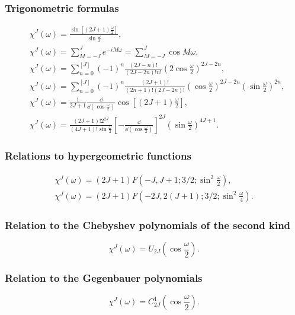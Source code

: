 \subsubsection{ Trigonometric formulas}
\begin{align}
& \chi^{J}(\omega)=\frac{\sin \left[(2 J+1) \frac{\omega}{2}\right]}{\sin \frac{\omega}{2}}  ,\label{eq:4:14:3}\\
& \chi^{J}(\omega)=\sum_{M=-J}^{J} e^{-i M \omega}=\sum_{M=-J}^{J} \cos M \omega , \label{eq:4:14:4}\\
& \chi^{J}(\omega)=\sum_{n=0}^{[J]}(-1)^{n} \frac{(2 J-n)!}{(2 J-2 n)!n!}\left(2 \cos \frac{\omega}{2}\right)^{2 J-2 n} , \label{eq:4:14:5}\\
& \chi^{J}(\omega)=\sum_{n=0}^{[J]}(-1)^{n} \frac{(2 J+1)!}{(2 n+1)!(2 J-2 n)!}\left(\cos \frac{\omega}{2}\right)^{2 J-2 n}\left(\sin \frac{\omega}{2}\right)^{2 n} , \label{eq:4:14:6}\\
& \chi^{J}(\omega)=\frac{1}{2 J+1} \frac{\dd}{\dd\left(\cos \frac{\omega}{2}\right)} \cos \left[(2 J+1) \frac{\omega}{2}\right] , \label{eq:4:14:7}\\
& \chi^{J}(\omega)=\frac{(2 J+1)!2^{2 J}}{(4 J+1)!\sin \frac{\omega}{2}}\left[-\frac{\dd}{\dd\left(\cos \frac{\omega}{2}\right)}\right]^{2 J}\left(\sin \frac{\omega}{2}\right)^{4 J+1}. \label{eq:4:14:8}
\end{align}
\subsubsection{ Relations to hypergeometric functions}
\begin{gather}
\chi^{J}(\omega)=(2 J+1) F\left(-J, J+1 ; 3 / 2 ; \sin ^{2} \frac{\omega}{2}\right) , \label{eq:4:14:9}\\
\chi^{J}(\omega)=(2 J+1) F\left(-2 J, 2(J+1) ; 3 / 2 ; \sin ^{2} \frac{\omega}{4}\right) .\label{eq:4:14:10}
\end{gather}
\subsubsection{ Relation to the Chebyshev polynomials of the second kind}
\begin{equation}
\chi^{J}(\omega)=U_{2 J}\left(\cos \frac{\omega}{2}\right) .\label{eq:4:14:11}
\end{equation}
\subsubsection{ Relation to the Gegenbauer polynomials}
\begin{equation}
\chi^{J}(\omega)=C_{2 J}^{1}\left(\cos \frac{\omega}{2}\right) .\label{eq:4:14:12}
\end{equation}
